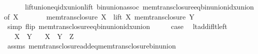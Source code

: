 \begin{isabellebody}
\ \ \ \ \ \ lift{\isacharunderscore}{\kern0pt}union{\isacharunderscore}{\kern0pt}eq{\isacharunderscore}{\kern0pt}idx{\isacharunderscore}{\kern0pt}union{\isacharunderscore}{\kern0pt}lift\ bin{\isacharunderscore}{\kern0pt}union{\isacharunderscore}{\kern0pt}assoc\ mem{\isacharunderscore}{\kern0pt}trans{\isacharunderscore}{\kern0pt}closure{\isacharunderscore}{\kern0pt}eq{\isacharunderscore}{\kern0pt}bin{\isacharunderscore}{\kern0pt}union{\isacharunderscore}{\kern0pt}idx{\isacharunderscore}{\kern0pt}union{\isacharbrackleft}{\kern0pt}of\ X{\isacharbrackright}{\kern0pt}{\isacharparenright}{\kern0pt}\isanewline
\ \ \isamarkupfalse%
\ \isamarkupfalse%
\ {\isachardoublequoteopen}{\isachardot}{\kern0pt}{\isachardot}{\kern0pt}{\isachardot}{\kern0pt}\ {\isacharequal}{\kern0pt}\ mem{\isacharunderscore}{\kern0pt}trans{\isacharunderscore}{\kern0pt}closure\ X\ {\isasymunion}\ lift\ X\ {\isacharparenleft}{\kern0pt}mem{\isacharunderscore}{\kern0pt}trans{\isacharunderscore}{\kern0pt}closure\ Y{\isacharparenright}{\kern0pt}{\isachardoublequoteclose}\isanewline
\ \ \ \ \isamarkupfalse%
\ {\isacharparenleft}{\kern0pt}simp\ flip{\isacharcolon}{\kern0pt}\ mem{\isacharunderscore}{\kern0pt}trans{\isacharunderscore}{\kern0pt}closure{\isacharunderscore}{\kern0pt}eq{\isacharunderscore}{\kern0pt}bin{\isacharunderscore}{\kern0pt}union{\isacharunderscore}{\kern0pt}idx{\isacharunderscore}{\kern0pt}union{\isacharparenright}{\kern0pt}\isanewline
\ \ \isamarkupfalse%
\ \isamarkupfalse%
\ {\isacharquery}{\kern0pt}case\ \isacommand{{\isachardot}{\kern0pt}}\isamarkupfalse%
\isanewline
{}\isamarkupfalse%
%
\endisatagproof
{\isafoldproof}%
%
\isadelimproof
\isanewline
%
\endisadelimproof
\isanewline
{}\isamarkupfalse%
\ lt{\isacharunderscore}{\kern0pt}add{\isacharunderscore}{\kern0pt}if{\isacharunderscore}{\kern0pt}lt{\isacharunderscore}{\kern0pt}left{\isacharcolon}{\kern0pt}\isanewline
\ \ \ {\isachardoublequoteopen}X\ {\isacharless}{\kern0pt}\ Y{\isachardoublequoteclose}\isanewline
\ \ \ {\isachardoublequoteopen}X\ {\isacharless}{\kern0pt}\ Y\ {\isacharplus}{\kern0pt}\ Z{\isachardoublequoteclose}\isanewline
%
\isadelimproof
\ \ %
\endisadelimproof
%
\isatagproof
{}\isamarkupfalse%
\ assms\ mem{\isacharunderscore}{\kern0pt}trans{\isacharunderscore}{\kern0pt}closure{\isacharunderscore}{\kern0pt}add{\isacharunderscore}{\kern0pt}eq{\isacharunderscore}{\kern0pt}mem{\isacharunderscore}{\kern0pt}trans{\isacharunderscore}{\kern0pt}closure{\isacharunderscore}{\kern0pt}bin{\isacharunderscore}{\kern0pt}union\isanewline

\end{isabellebody}
